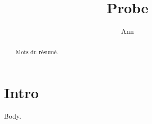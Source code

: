 \documentclass{article}
\begin{document}
\title{Probe}\author{Ann}
\begin{otherlanguage}{french}
\begin{abstract}Mots du résumé.\end{abstract}
\end{otherlanguage}
\maketitle
\section{Intro}
Body.
\end{document}
